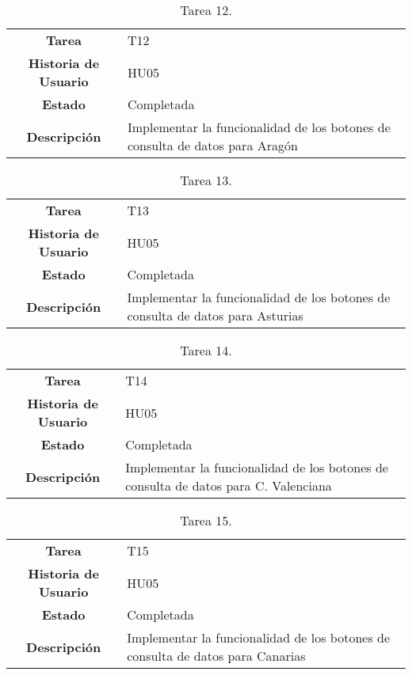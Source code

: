 \begin{table}[H]
	\begin{center}
		\begin{tabular}{| c | p{9cm} |}
			\hline
			
			\textbf{Tarea} & T12 \\
			\textbf{Historia de Usuario} & HU05 \\
			\textbf{Estado} & Completada \\
			\textbf{Descripción} & Implementar la funcionalidad de los botones de consulta de datos para Aragón \\ \hline
		\end{tabular}
		\caption{Tarea 12.}
	\end{center}
\end{table}

\begin{table}[H]
	\begin{center}
		\begin{tabular}{| c | p{9cm} |}
			\hline
			
			\textbf{Tarea} & T13 \\
			\textbf{Historia de Usuario} & HU05 \\
			\textbf{Estado} & Completada \\
			\textbf{Descripción} & Implementar la funcionalidad de los botones de consulta de datos para Asturias \\ \hline
		\end{tabular}
		\caption{Tarea 13.}
	\end{center}
\end{table}

\begin{table}[H]
	\begin{center}
		\begin{tabular}{| c | p{9cm} |}
			\hline
			
			\textbf{Tarea} & T14 \\
			\textbf{Historia de Usuario} & HU05 \\
			\textbf{Estado} & Completada \\
			\textbf{Descripción} & Implementar la funcionalidad de los botones de consulta de datos para C. Valenciana \\ \hline
		\end{tabular}
		\caption{Tarea 14.}
	\end{center}
\end{table}

\begin{table}[H]
	\begin{center}
		\begin{tabular}{| c | p{9cm} |}
			\hline
			
			\textbf{Tarea} & T15 \\
			\textbf{Historia de Usuario} & HU05 \\
			\textbf{Estado} & Completada \\
			\textbf{Descripción} & Implementar la funcionalidad de los botones de consulta de datos para Canarias \\ \hline
		\end{tabular}
		\caption{Tarea 15.}
	\end{center}
\end{table}

